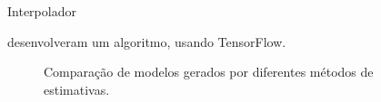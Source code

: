 \documentclass[aspectratio=169]{beamer}
\begin{document}
\begin{frame}{Interpolador}
	
	\cite{samson_estimation_ml} desenvolveram um algoritmo, usando TensorFlow.

	\begin{figure}[H] 
		\caption{Comparação de modelos gerados por diferentes métodos de estimativas.} \label{comparation}
		 \centering
	\end{figure}
	
\end{frame}
\end{document}
